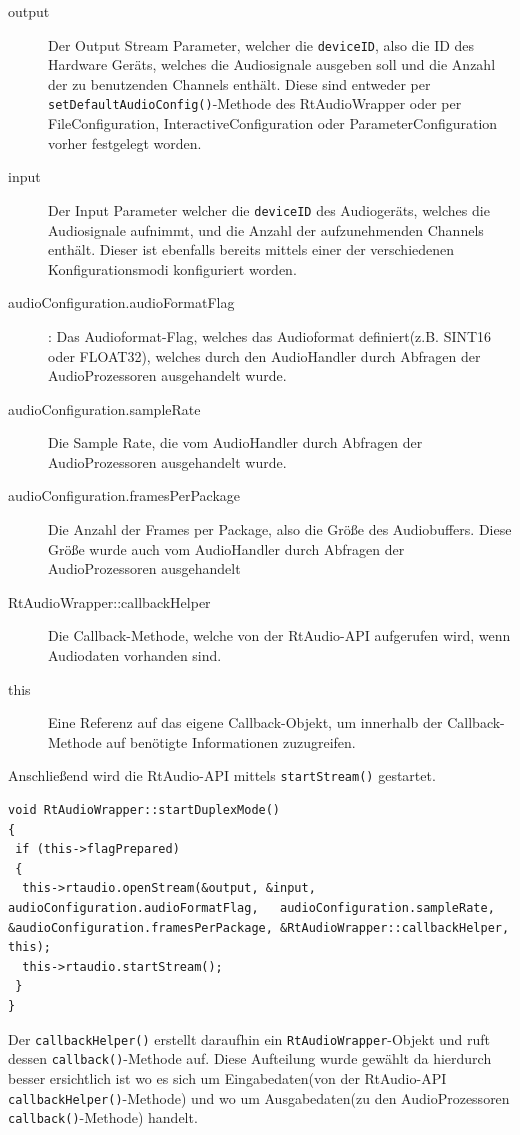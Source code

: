 \begin{description}
\item[output] Der Output Stream Parameter, welcher die \texttt{deviceID}, also die ID des Hardware Geräts, welches die Audiosignale ausgeben soll und die Anzahl der zu benutzenden Channels enthält. Diese sind entweder per \texttt{setDefaultAudio\-Config()}-Methode des RtAudioWrapper oder per FileConfiguration, InteractiveConfiguration oder ParameterConfiguration vorher festgelegt worden.
\item [input] Der Input Parameter welcher die \texttt{deviceID} des Audiogeräts, welches die Audiosignale aufnimmt, und die Anzahl der aufzunehmenden Channels enthält. Dieser ist ebenfalls bereits mittels einer der verschiedenen Konfigurationsmodi konfiguriert worden.
\item [audioConfiguration.audioFormatFlag] : Das Audioformat-Flag, welches das Audioformat definiert(z.B. SINT16 oder FLOAT32), welches durch den AudioHandler durch Abfragen der AudioProzessoren ausgehandelt wurde.
\item [audioConfiguration.sampleRate] Die Sample Rate, die vom AudioHandler durch Abfragen der AudioProzessoren ausgehandelt wurde.
\item [audioConfiguration.framesPerPackage] Die Anzahl der Frames per Package, also die Größe des Audiobuffers. Diese Größe wurde auch vom AudioHandler durch Abfragen der AudioProzessoren ausgehandelt
\item [RtAudioWrapper::callbackHelper] Die Callback-Methode, welche von der RtAudio-API aufgerufen wird, wenn Audiodaten vorhanden sind.
\item [this] Eine Referenz auf das eigene Callback-Objekt, um innerhalb der Callback-Methode auf benötigte Informationen zuzugreifen.
\end{description}

Anschließend wird die RtAudio-API mittels \texttt{startStream()} gestartet.

\begin{lstlisting}[caption={Start des Duplex Mode im RtAudioWrapper},label={Code:RtAudio DuplexMode}]
void RtAudioWrapper::startDuplexMode()
{
 if (this->flagPrepared)
 {
  this->rtaudio.openStream(&output, &input, audioConfiguration.audioFormatFlag,   audioConfiguration.sampleRate, &audioConfiguration.framesPerPackage, &RtAudioWrapper::callbackHelper, this);
  this->rtaudio.startStream();
 }
}
\end{lstlisting}

Der \texttt{callbackHelper()} erstellt daraufhin ein \texttt{RtAudioWrapper}-Objekt und ruft dessen \texttt{callback()}-Methode auf. Diese Aufteilung wurde gewählt da hierdurch besser ersichtlich ist wo es sich um Eingabedaten(von der RtAudio-API \texttt{callbackHelper()}-Methode) und wo um Ausgabedaten(zu den AudioProzessoren \texttt{callback()}-Methode) handelt.

